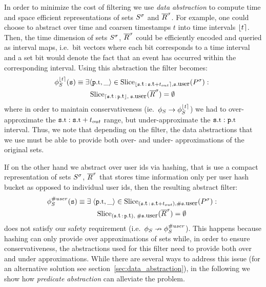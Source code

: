 In order to minimize the cost of filtering we use {\em data abstraction} to 
compute time and space efficient representations of sets ${S}^{\sigma}$ and 
${\overline{R}}^{\sigma}$.
For example, one could choose to abstract over time and coarsen timestamps $t$
into time intervals $\lfloor t \rceil$. 
Then, the time dimension of sets ${S}^{\sigma}$, ${\overline{R}}^{\sigma}$ could be efficiently 
encoded and queried as interval maps, i.e.\ bit vectors where each bit 
corresponds to a time interval and a set bit would denote the fact that an 
event has occurred within the corresponding interval.
Using this abstraction the filter becomes:
\begin{align*}
\PrecedesP^{\interval{t}}(\symv{s}) 
&\equiv  
\exists \tuple{\facc{\symv{p}}{t}, \_} \in 
\slice{\syms{P}}
{\interval{\facc{\symv{s}}{t}\,:\,\facc{\symv{s}}{t} + t_{out}},
	\facc{\symv{s}}{user}} :\ 
\\
&\qquad
\slice{\syms{\oR}}
{\uinterval{\facc{\symv{s}}{t}\,:\,\facc{\symv{p}}{t}},\; 
 \facc{\symv{s}}{user}}
= \emptyset 
\end{align*}
where in order to maintain conservativeness (ie.\
$\phi_{S} \rightarrow \phi_{S}^{\lfloor t \rceil} $) we had to
over-approximate the $\facc{\symv{s}}{t}:\facc{\symv{s}}{t} + t_{out}$ 
range, but under-approximate the
$\facc{\symv{s}}{t}:\facc{\symv{p}}{t}$ interval.
Thus, we note that depending on the filter, the data abstractions that we
use must be able to provide both over- and under- approximations of the original
sets. 
  

If on the other hand we abstract over user ids via hashing, that is
use a compact representation of sets ${S}^{\sigma}$, ${\overline{R}}^{\sigma}$ that stores time
information only per user hash bucket as opposed to individual user ids, then
the resulting abstract filter:
\begin{align*}
&
\PrecedesP^{\hashid{user}}(\symv{s}) \equiv 
\exists\; \tuple{\facc{\symv{p}}{t}, \_} \in 
\slice{\syms{P}}
{(\facc{\symv{s}}{t}\,:\,\facc{\symv{s}}{t} + t_{out}),
	\hashid{\facc{\symv{s}}{user}}} :\ 
\\
&\qqquad\qquad\quad
\slice{\syms{\oR}}
{(\facc{\symv{s}}{t}\,:\,\facc{\symv{p}}{t}),\; 
	\hashid{\facc{\symv{s}}{user}}}
= \emptyset 
\end{align*}
does not satisfy our safety requirement 
(i.e.\ $\phi_{S} \nrightarrow \phi_{S}^{\# user}$).
This happens because hashing can only provide over approximations of sets while,
in order to ensure conservativeness, the abstractions used for this filter need
to provide both over and under approximations.
While there are several ways to address this issue (for an alternative solution 
see section~\ref{sec:data_abstraction}), 
in the following we show how {\em predicate abstraction} can alleviate the 
problem.


